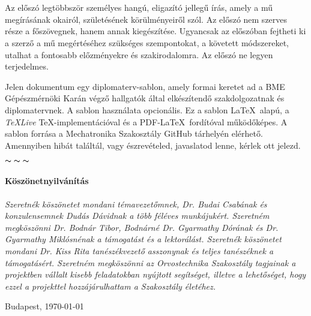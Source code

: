 \chapter*{\eloszo}

Az előszó legtöbbször személyes hangú, eligazító jellegű írás, amely a mű megírásának okairól, születésének körülményeiről szól. Az előszó nem szerves része a főszövegnek, hanem annak kiegészítése.
Ugyancsak az előszóban fejtheti ki a szerző a mű megértéséhez szükséges szempontokat, a követett módszereket, utalhat a fontosabb előzményekre és szakirodalomra.
Az előszó ne legyen terjedelmes.


Jelen dokumentum egy diplomaterv-sablon, amely formai keretet ad a BME Gépészmérnöki Karán végző hallgatók által elkészítendő szakdolgozatnak és diplomatervnek. A sablon használata opcionális. Ez a sablon \LaTeX~alapú, a \emph{TeXLive} \TeX-implementációval és a PDF-\LaTeX~fordítóval működőképes.
A sablon forrása a Mechatronika Szakosztály GitHub tárhelyén\footnotemark{} elérhető. Amennyiben hibát találtál, vagy észrevételed, javaslatod lenne, kérlek ott jelezd.


\begin{center}
    $\thicksim \; \thicksim \; \thicksim$
\end{center}


\subsubsection*{Köszönetnyilvánítás}
\emph{Szeretnék köszönetet mondani témavezetőmnek, Dr. Budai Csabának és konzulensemnek Dudás Dávidnak a több féléves munkájukért. Szeretném megköszönni Dr. Bodnár Tibor, Bodnárné Dr. Gyarmathy Dórának és Dr. Gyarmathy Miklósnénak a támogatást és a lektorálást. Szeretnék köszönetet mondani Dr. Kiss Rita tanészékvezető asszonynak és teljes tanészéknek a támogatásért. Szeretném megköszönni az Orvostechnika Szakosztály tagjainak a projektben vállalt kisebb feladatokban nyújtott segítséget, illetve a lehetőséget, hogy ezzel a projekttel hozzájárulhattam a Szakosztály életéhez.} 


\vspace{0.5cm}

\begin{flushleft}
{Budapest, \today}
\end{flushleft}

\begin{flushright}
\emph{\authorName}
\end{flushright}

\vfill
